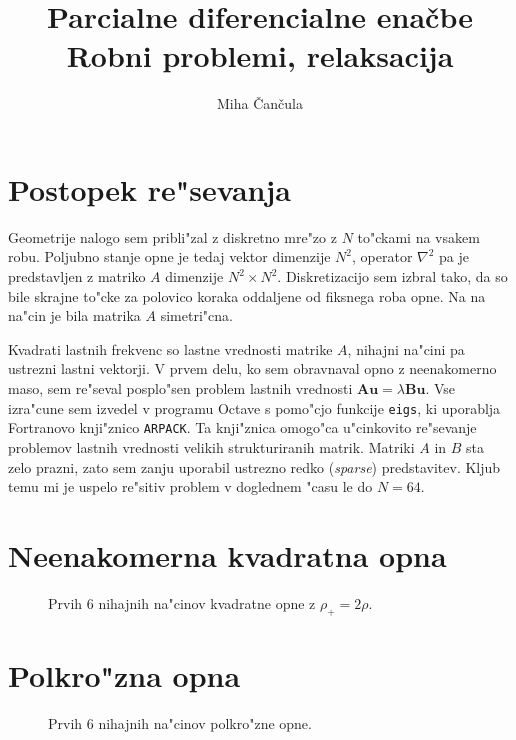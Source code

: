 \documentclass[a4paper,10pt]{article}
\title{Parcialne diferencialne ena\v cbe \\ Robni problemi, relaksacija}
\author{Miha \v Can\v cula}
\renewcommand{\vec}{\mathbf}
\begin{document}
\maketitle

\section{Postopek re"sevanja}

Geometrije nalogo sem pribli"zal z diskretno mre"zo z $N$ to"ckami na vsakem robu. Poljubno stanje opne je tedaj vektor dimenzije $N^2$, operator $\nabla^2$ pa je predstavljen z matriko $A$ dimenzije $N^2 \times N^2$. Diskretizacijo sem izbral tako, da so bile skrajne to"cke za polovico koraka oddaljene od fiksnega roba opne. Na na na"cin je bila matrika $A$ simetri"cna. 

Kvadrati lastnih frekvenc so lastne vrednosti matrike $A$, nihajni na"cini pa ustrezni lastni vektorji. V prvem delu, ko sem obravnaval opno z neenakomerno maso, sem re"seval posplo"sen problem lastnih vrednosti $\vec A\vec u = \lambda \vec B \vec u$. Vse izra"cune sem izvedel v programu Octave s pomo"cjo funkcije \texttt{eigs}, ki uporablja Fortranovo knji"znico \texttt{ARPACK}. Ta knji"znica omogo"ca u"cinkovito re"sevanje problemov lastnih vrednosti velikih strukturiranih matrik. Matriki $A$ in $B$ sta zelo prazni, zato sem zanju uporabil ustrezno redko (\textit{sparse}) predstavitev. Kljub temu mi je uspelo re"sitiv problem v doglednem "casu le do $N = 64$. 

\section{Neenakomerna kvadratna opna}

\begin{figure}[H]
\caption{Prvih 6 nihajnih na"cinov kvadratne opne z $\rho_+ = 2\rho$. }
\end{figure}

\section{Polkro"zna opna}

\begin{figure}[H]
\caption{Prvih 6 nihajnih na"cinov polkro"zne opne.}
\end{figure}
\end{document}
